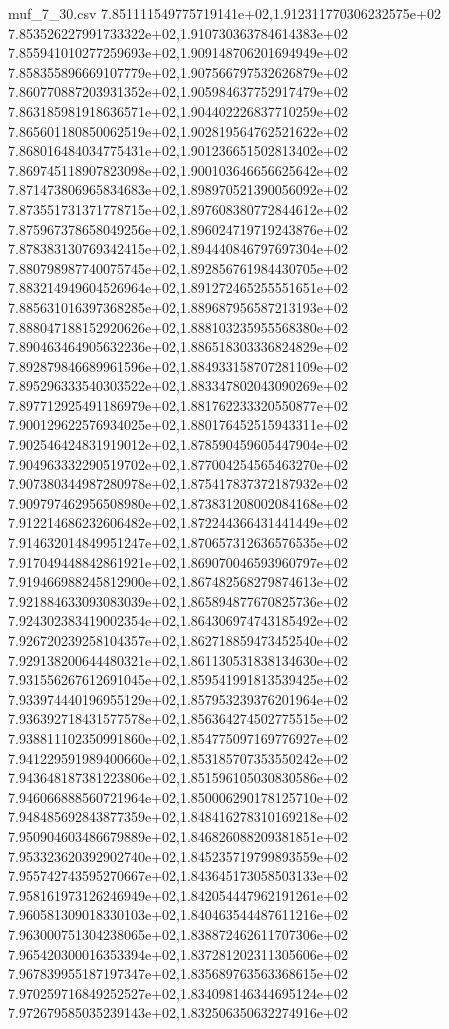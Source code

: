\begin{filecontents*}{muf_7_30.csv}
7.851111549775719141e+02,1.912311770306232575e+02
7.853526227991733322e+02,1.910730363784614383e+02
7.855941010277259693e+02,1.909148706201694949e+02
7.858355896669107779e+02,1.907566797532626879e+02
7.860770887203931352e+02,1.905984637752917479e+02
7.863185981918636571e+02,1.904402226837710259e+02
7.865601180850062519e+02,1.902819564762521622e+02
7.868016484034775431e+02,1.901236651502813402e+02
7.869745118907823098e+02,1.900103646656625642e+02
7.871473806965834683e+02,1.898970521390056092e+02
7.873551731371778715e+02,1.897608380772844612e+02
7.875967378658049256e+02,1.896024719719243876e+02
7.878383130769342415e+02,1.894440846797697304e+02
7.880798987740075745e+02,1.892856761984430705e+02
7.883214949604526964e+02,1.891272465255551651e+02
7.885631016397368285e+02,1.889687956587213193e+02
7.888047188152920626e+02,1.888103235955568380e+02
7.890463464905632236e+02,1.886518303336824829e+02
7.892879846689961596e+02,1.884933158707281109e+02
7.895296333540303522e+02,1.883347802043090269e+02
7.897712925491186979e+02,1.881762233320550877e+02
7.900129622576934025e+02,1.880176452515943311e+02
7.902546424831919012e+02,1.878590459605447904e+02
7.904963332290519702e+02,1.877004254565463270e+02
7.907380344987280978e+02,1.875417837372187932e+02
7.909797462956508980e+02,1.873831208002084168e+02
7.912214686232606482e+02,1.872244366431441449e+02
7.914632014849951247e+02,1.870657312636576535e+02
7.917049448842861921e+02,1.869070046593960797e+02
7.919466988245812900e+02,1.867482568279874613e+02
7.921884633093083039e+02,1.865894877670825736e+02
7.924302383419002354e+02,1.864306974743185492e+02
7.926720239258104357e+02,1.862718859473452540e+02
7.929138200644480321e+02,1.861130531838134630e+02
7.931556267612691045e+02,1.859541991813539425e+02
7.933974440196955129e+02,1.857953239376201964e+02
7.936392718431577578e+02,1.856364274502775515e+02
7.938811102350991860e+02,1.854775097169776927e+02
7.941229591989400660e+02,1.853185707353550242e+02
7.943648187381223806e+02,1.851596105030830586e+02
7.946066888560721964e+02,1.850006290178125710e+02
7.948485692843877359e+02,1.848416278310169218e+02
7.950904603486679889e+02,1.846826088209381851e+02
7.953323620392902740e+02,1.845235719799893559e+02
7.955742743595270667e+02,1.843645173058503133e+02
7.958161973126246949e+02,1.842054447962191261e+02
7.960581309018330103e+02,1.840463544487611216e+02
7.963000751304238065e+02,1.838872462611707306e+02
7.965420300016353394e+02,1.837281202311305606e+02
7.967839955187197347e+02,1.835689763563368615e+02
7.970259716849252527e+02,1.834098146344695124e+02
7.972679585035239143e+02,1.832506350632274916e+02

\end{filecontents*}
